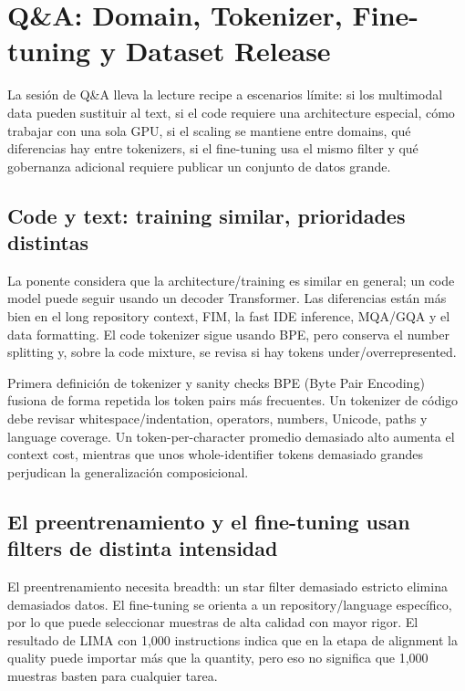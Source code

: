 \section{Q\&A: Domain, Tokenizer, Fine-tuning y Dataset Release}

La sesión de Q\&A lleva la lecture recipe a escenarios límite: si los multimodal data pueden sustituir al text, si el code requiere una architecture especial, cómo trabajar con una sola GPU, si el scaling se mantiene entre domains, qué diferencias hay entre tokenizers, si el fine-tuning usa el mismo filter y qué gobernanza adicional requiere publicar un conjunto de datos grande.

\subsection{Code y text: training similar, prioridades distintas}

La ponente considera que la architecture/training es similar en general; un code model puede seguir usando un decoder Transformer. Las diferencias están más bien en el long repository context, FIM, la fast IDE inference, MQA/GQA y el data formatting. El code tokenizer sigue usando BPE, pero conserva el number splitting y, sobre la code mixture, se revisa si hay tokens under/overrepresented.

\begin{knowledgebox}{Primera definición de tokenizer y sanity checks}
BPE (Byte Pair Encoding) fusiona de forma repetida los token pairs más frecuentes. Un tokenizer de código debe revisar whitespace/indentation, operators, numbers, Unicode, paths y language coverage. Un token-per-character promedio demasiado alto aumenta el context cost, mientras que unos whole-identifier tokens demasiado grandes perjudican la generalización composicional.
\end{knowledgebox}


\subsection{El preentrenamiento y el fine-tuning usan filters de distinta intensidad}

El preentrenamiento necesita breadth: un star filter demasiado estricto elimina demasiados datos. El fine-tuning se orienta a un repository/language específico, por lo que puede seleccionar muestras de alta calidad con mayor rigor. El resultado de LIMA con 1,000 instructions indica que en la etapa de alignment la quality puede importar más que la quantity, pero eso no significa que 1,000 muestras basten para cualquier tarea.

